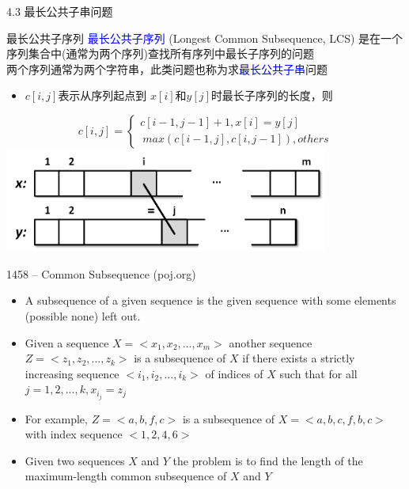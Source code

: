 \begin{frame}{4.3 最长公共子串问题}
    \begin{block}{最长公共子序列}
        \textcolor{blue}{最长公共子序列} (Longest Common Subsequence, LCS) 是在一个序列集合中(通常为两个序列)查找所有序列中最长子序列的问题\\
        两个序列通常为两个字符串，此类问题也称为求\textcolor{blue}{最长公共子串}问题
    \end{block}
    \begin{itemize}
        \item $c[i,j]$表示从序列起点到 $x[i]$和$y[j]$时最长子序列的长度，则
    \end{itemize}
    $$c[i,j]=\begin{cases} c[i-1,j-1]+1, x[i]=y[j] \\\ max(c[i-1,j],c[i,j-1]), others \end{cases}$$
    \includegraphics[width=0.8\textwidth,center]{fig/4-5.png}
\end{frame}
\begin{frame}{1458 -- Common Subsequence (poj.org)}
    \begin{itemize}
        \item A subsequence of a given sequence is the given sequence with some elements (possible none) left out.
        \item Given a sequence $X=<x_1, x_2, ..., x_m>$ another sequence $Z=< z_1, z_2, ..., z_k>$ is a subsequence of $X$ if there exists a strictly increasing sequence $<i_1, i_2, ..., i_k>$ of indices of $X$ such that for all $j=1,2,...,k, x_{i_j}=z_j$
        \item For example, $Z=<a, b, f, c>$ is a subsequence of $X=<a, b, c, f, b, c>$ with	index sequence $<1, 2, 4, 6>$
        \item Given two sequences $X$ and $Y$ the problem is to find the length of the maximum-length common subsequence of $X$ and $Y$
    \end{itemize}
\end{frame}
